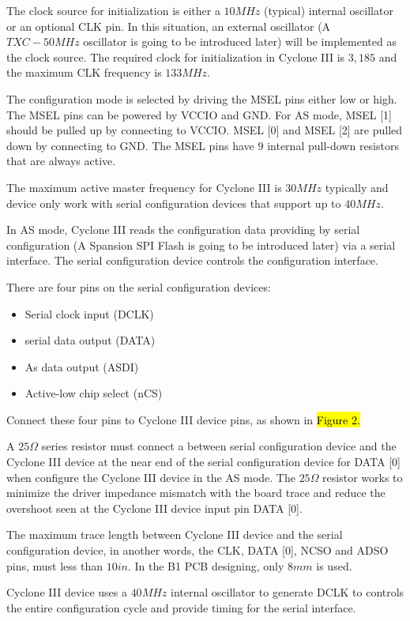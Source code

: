 The clock source for initialization is either a $10MHz$ (typical) internal oscillator or an optional CLK pin. In this situation, an external oscillator (A $TXC-50MHz$ oscillator is going to be introduced later) will be implemented as the clock source. The required clock for initialization in Cyclone III is $3,185$ and the maximum CLK frequency is $133MHz$.

The configuration mode is selected by driving the MSEL pins either low or high. The MSEL pins can be powered by VCCIO and GND. For AS mode, MSEL [1] should be pulled up by connecting to VCCIO. MSEL [0] and MSEL [2] are pulled down by connecting to GND. The MSEL pins have $9$ internal pull-down resistors that are always active.

The maximum active master frequency for Cyclone III is $30MHz$ typically and device only work with serial configuration devices that support up to $40MHz$.

In AS mode, Cyclone III reads the configuration data providing by serial configuration (A Spansion SPI Flash is going to be introduced later) via a serial interface. The serial configuration device controls the configuration interface.

There are four pins on the serial configuration devices:
\begin{itemize}
 \item Serial clock input (DCLK)
 \item serial data output (DATA)
 \item As data output (ASDI)
 \item Active-low chip select (nCS)
\end{itemize}

Connect these four pins to Cyclone III device pins, as shown in \hl{Figure 2.}


A $25\Omega$ series resistor must connect a between serial configuration device and the Cyclone III device at the near end of the serial configuration device for DATA [0] when configure the Cyclone III device in the AS mode. The $25\Omega$ resistor works to minimize the driver impedance mismatch with the board trace and reduce the overshoot seen at the Cyclone III device input pin DATA [0].

The maximum trace length between Cyclone III device and the serial configuration device, in another words, the CLK, DATA [0], NCSO and ADSO pins, must less than $10in$. In the B1 PCB designing, only $8mm$ is used.

Cyclone III device uses a $40MHz$ internal oscillator to generate DCLK to controls the entire configuration cycle and provide timing for the serial interface.

